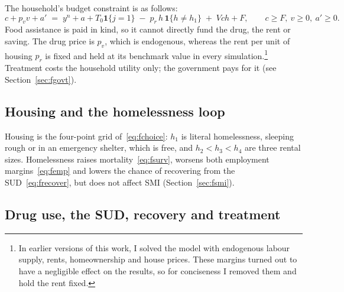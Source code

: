 \documentclass[10pt]{article}
\begin{document}
The household's budget constraint is as follows:
\begin{equation}\label{eq:fbudget}
c+p_v v+a' \;=\; y^{n}+a+T_0\mathbf{1}\{j=1\}\;-\;p_r\, h\,\mathbf{1}\{h\neq h_1\}\;+\;V\!ch+F,
\qquad c\ge F,\ v\ge0,\ a'\ge0 .
\end{equation}
Food assistance is paid in kind, so it cannot directly fund the drug, the rent or saving. The
drug price is $p_v$, which is endogenous, whereas the rent per unit of housing $p_r$ is fixed and held at its benchmark value
in every simulation.\footnote{\label{fn:nolabour}In earlier versions of this work, I solved the model with endogenous labour supply, rents, homeownership and house prices. These margins turned out to have a negligible effect on the results, so for conciseness I removed them and hold the rent fixed.} Treatment costs the household utility only; the government pays for it (see Section~\ref{sec:fgovt}).

\subsection{Housing and the homelessness loop}

Housing is the four-point grid of~\eqref{eq:fchoice}: $h_1$ is literal
homelessness, sleeping rough or in an emergency shelter, which is free, and $h_2<h_3<h_4$
are three rental sizes. Homelessness raises mortality~\eqref{eq:fsurv}, worsens both employment margins~\eqref{eq:femp} and lowers the chance of recovering from the SUD~\eqref{eq:frecover}, but does not affect SMI (Section~\ref{sec:fsmi}).

\subsection{Drug use, the SUD, recovery and treatment}\label{sec:fdrug}
\end{document}
